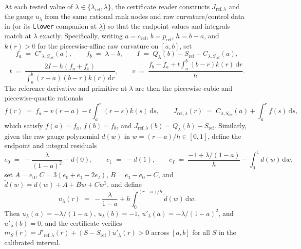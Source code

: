 \documentclass[11pt]{article}
\numberwithin{equation}{section}
\theoremstyle{plain}
\theoremstyle{definition}
\newcommand{\1}{\mathbf{1}}
\begin{document}
At each tested value of $\lambda \in \{\lambda_{\mathrm{ref}}, \underline{\lambda}\}$, the certificate reader constructs $J_{\mathrm{ref}, \lambda}$ and the gauge $u_\lambda$ from the same rational rank nodes and raw curvature/control data in  (or its \texttt{Llower} companion at $\underline{\lambda}$) so that the endpoint values and integrals match at $\lambda$ exactly. Specifically, writing $a = c_{\mathrm{ref}}$, $b = p_{\mathrm{ref}}$, $h = b - a$, and $k(r) > 0$ for the piecewise-affine raw curvature on $[a, b]$, set
\[
  f_a \;=\; C'_{\lambda, S_{\mathrm{ref}}}(a),
  \qquad
  f_b \;=\; \lambda - b,
  \qquad
  I \;=\; Q_\lambda(b) - S_{\mathrm{ref}} - C_{\lambda, S_{\mathrm{ref}}}(a),
\]
\[
  t \;=\; \frac{2I - h(f_a + f_b)}{\int_a^b (r - a)(b - r)k(r)\,\mathrm{d}r},
  \qquad
  v \;=\; \frac{f_b - f_a + t\int_a^b (b - r)k(r)\,\mathrm{d}r}{h}.
\]
The reference derivative and primitive at $\lambda$ are then the piecewise-cubic and piecewise-quartic rationals
\[
  f(r) \;=\; f_a + v(r - a) - t\int_a^r (r - s)k(s)\,\mathrm{d}s,
  \qquad
  J_{\mathrm{ref}, \lambda}(r) \;=\; C_{\lambda, S_{\mathrm{ref}}}(a) + \int_a^r f(s)\,\mathrm{d}s,
\]
which satisfy $f(a) = f_a$, $f(b) = f_b$, and $J_{\mathrm{ref}, \lambda}(b) = Q_\lambda(b) - S_{\mathrm{ref}}$. Similarly, given the raw gauge polynomial $d(w)$ in $w = (r - a)/h \in [0, 1]$, define the endpoint and integral residuals
\[
  e_0 \;=\; -\frac{\lambda}{(1 - a)^2} - d(0),
  \qquad
  e_1 \;=\; -d(1),
  \qquad
  e_I \;=\; \frac{-1 + \lambda/(1 - a)}{h} - \int_0^1 d(w)\,\mathrm{d}w,
\]
set $A = e_0$, $C = 3(e_0 + e_1 - 2e_I)$, $B = e_1 - e_0 - C$, and $\widetilde{d}(w) = d(w) + A + B w + C w^2$, and define
\[
  u_\lambda(r) \;=\; -\frac{\lambda}{1 - a} + h\int_0^{(r - a)/h} \widetilde{d}(w)\,\mathrm{d}w.
\]
Then $u_\lambda(a) = -\lambda/(1 - a)$, $u_\lambda(b) = -1$, $u'_\lambda(a) = -\lambda/(1 - a)^2$, and $u'_\lambda(b) = 0$, and the certificate verifies $m_S(r) = J'_{\mathrm{ref}, \lambda}(r) + (S - S_{\mathrm{ref}})u'_\lambda(r) > 0$ across $[a, b]$ for all $S$ in the calibrated interval.
\end{document}
